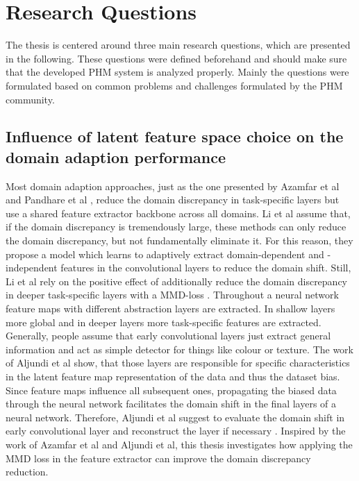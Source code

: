 \section{Research Questions}
The thesis is centered around three main research questions, which are presented in the following. These questions were defined beforehand and should make sure that the developed PHM system is analyzed properly. Mainly the questions were formulated based on common problems and challenges formulated by the PHM community. 

\subsection{Influence of latent feature space choice on the domain adaption performance}
Most domain adaption approaches, just as the one presented by Azamfar et al \cite{AZAMFAR2020103932} and Pandhare et al \cite{Pandhare2021}, reduce the domain discrepancy in task-specific layers but use a shared feature extractor backbone across all domains. Li et al \cite{li2020} assume that, if the domain discrepancy is tremendously large, these methods can only reduce the domain discrepancy, but not fundamentally eliminate it. For this reason, they propose a model which learns to adaptively extract domain-dependent and -independent features in the convolutional layers to reduce the domain shift. Still, Li et al rely on the positive effect of additionally reduce the domain discrepancy in deeper task-specific layers with a MMD-loss \cite{li2020}. Throughout a neural network feature maps with different abstraction layers are extracted. In shallow layers more global and in deeper layers more task-specific features are extracted. Generally, people assume that early convolutional layers just extract general information and act as simple detector for things like colour or texture. The work of Aljundi et al show, that those layers are responsible for specific characteristics in the latent feature map representation of the data and thus the dataset bias. Since feature maps influence all subsequent ones, propagating the biased data through the neural network facilitates the domain shift in the final layers of a neural network. Therefore, Aljundi et al suggest to evaluate the domain shift in early convolutional layer and reconstruct the layer if necessary \cite{Aljundi2016}. Inspired by the work of Azamfar et al and Aljundi et al, this thesis investigates how applying the MMD loss in the feature extractor can improve the domain discrepancy reduction.








